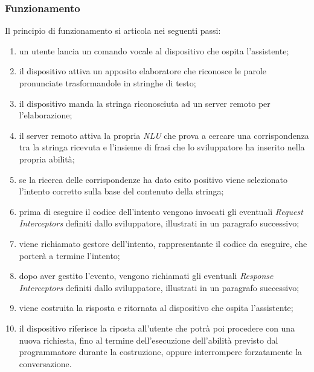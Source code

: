 		\subsubsection{Funzionamento}
		Il principio di funzionamento si articola nei seguenti passi:
		\begin{enumerate}
			\item un utente lancia un comando vocale al dispositivo che ospita l'assistente;
			\item il dispositivo attiva un apposito elaboratore che riconosce le parole pronunciate trasformandole in stringhe di testo;
			\item il dispositivo manda la stringa riconosciuta ad un server remoto per l'elaborazione;
			\item il server remoto attiva la propria \textit{NLU} che prova a cercare una corrispondenza tra la stringa ricevuta e l'insieme di frasi che lo sviluppatore ha inserito nella propria abilità;
			\item se la ricerca delle corrispondenze ha dato esito positivo viene selezionato l'intento corretto sulla base del contenuto della stringa;
			\item prima di eseguire il codice dell'intento vengono invocati gli eventuali \textit{Request Interceptors} definiti dallo sviluppatore, illustrati in un paragrafo successivo;
			\item viene richiamato gestore dell'intento, rappresentante il codice da eseguire, che porterà a termine l'intento;
			\item dopo aver gestito l'evento, vengono richiamati gli eventuali \textit{Response Interceptors} definiti dallo sviluppatore, illustrati in un paragrafo successivo;
			\item viene costruita la risposta e ritornata al dispositivo che ospita l'assistente;
			\item il dispositivo riferisce la riposta all'utente che potrà poi procedere con una nuova richiesta, fino al termine dell'esecuzione dell'abilità previsto dal programmatore durante la costruzione, oppure interrompere forzatamente la conversazione.
		\end{enumerate}
